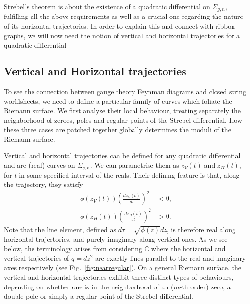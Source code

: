 \documentclass[english]{article}
\begin{document}
Strebel's theorem is about the existence of a quadratic differential on $\Sigma_{g,n}$, fulfilling all the above requirements as well as a crucial one regarding the nature of its horizontal trajectories. In order to explain this and connect with ribbon graphs, we will now need the notion of vertical and horizontal trajectories for a quadratic differential.

\subsection{Vertical and Horizontal trajectories} \label{sec:verthoztraj}

To see the connection between gauge theory Feynman diagrams and closed string worldsheets, we need to define a particular family of curves which foliate the Riemann surface. We first analyze their local behaviour, treating separately the neighborhood of zeroes, poles and regular points of the Strebel differential. How these three cases are patched together globally determines the moduli of the Riemann surface.

Vertical and horizontal trajectories can be defined for any quadratic differential and are (real) curves on $\Sigma_{g,n}$. We can parametrise them as $z_{V}(t)$ and $z_{H}(t)$, for $t$ in some specified interval of the reals. Their defining feature is that, along the trajectory, they satisfy
\begin{align}
    \phi\left( z_{V}(t) \right) \left( \frac{d z_{V}(t)}{dt} \right)^2 & < 0, \\
     \phi\left( z_{H}(t) \right) \left( \frac{d z_{H}(t)}{dt} \right)^2 & > 0 .
\end{align}
Note that the line element, defined as $d\tau=\sqrt{\phi(z)}dz$, is therefore real along horizontal trajectories, and purely imaginary along vertical ones. As we see below, the terminology arises from considering ${\mathbb C}$ where the horizontal and vertical trajectories of $q=dz^2$ are exactly lines parallel to the real and imaginary axes respectively (see Fig.~\ref{fig:nearregular}). On a general Riemann surface, the vertical and horizontal trajectories exhibit three distinct types of behaviours, depending on whether one is in the neighborhood of an ($m$-th order) zero, a double-pole or simply a regular point of the Strebel differential. 
\end{document}
